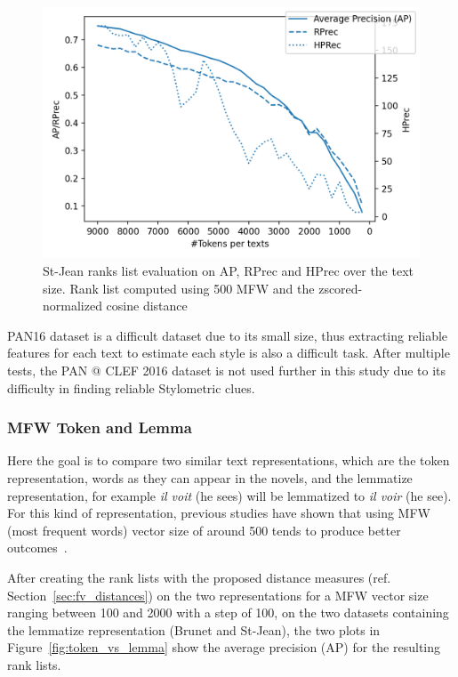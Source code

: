 \begin{figure}
  \centering
  \includegraphics[width=\linewidth]{img/degradation.png}
  \caption{St-Jean ranks list evaluation on AP, RPrec and HPrec over the text size. Rank list computed using 500 MFW and the zscored-normalized cosine distance}
  \label{img:degradation}
\end{figure}

PAN16 dataset is a difficult dataset due to its small size, thus extracting reliable features for each text to estimate each style is also a difficult task.
After multiple tests, the PAN @ CLEF 2016 dataset is not used further in this study due to its difficulty in finding reliable Stylometric clues.

\subsubsection{MFW Token and Lemma}

Here the goal is to compare two similar text representations, which are the token representation, words as they can appear in the novels, and the lemmatize representation, for example \textit{il voit} (he sees) will be lemmatized to \textit{il voir} (he see).
For this kind of representation, previous studies have shown that using MFW (most frequent words) vector size of around 500 tends to produce better outcomes~\cite{savoy_text_representation}.

After creating the rank lists with the proposed distance measures (ref. Section~\ref{sec:fv_distances}) on the two representations for a MFW vector size ranging between 100 and 2000 with a step of 100, on the two datasets containing the lemmatize representation (Brunet and St-Jean), the two plots in Figure~\ref{fig:token_vs_lemma} show the average precision (AP) for the resulting rank lists.

